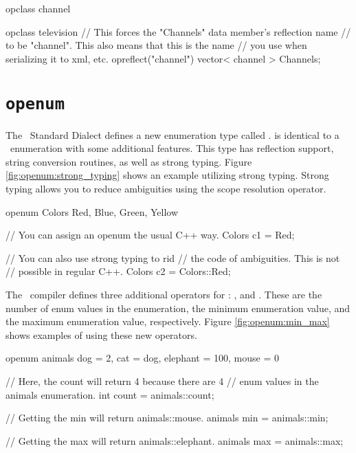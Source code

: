 \begin{opcpp}[label={fig:modifiers:opreflect},caption={Using the \opcppk{opreflect} data modifier.}]
opclass channel
{

}

opclass television
{
    // This forces the "Channels" data member's reflection name
    // to be "channel".  This also means that this is the name
    // you use when serializing it to xml, etc.
    opreflect("channel") vector< channel > Channels;
}
\end{opcpp}

\section{{\tt openum}}
\label{sec:opcpp_openum}

The \opCPP\ Standard Dialect defines a new enumeration type called .   is identical to a \cpp\ enumeration with some additional features.  This type has reflection support, string conversion routines, as well as strong typing.  Figure \ref{fig:openum:strong_typing} shows an example  utilizing strong typing.  Strong typing allows you to reduce ambiguities using the scope resolution operator. \\

\begin{opcpp}[label={fig:openum:strong_typing},caption={Example \opcppk{openum} utilizing strong typing.}]
openum Colors
{
    Red,
    Blue,
    Green,
    Yellow
}

// You can assign an openum the usual C++ way.
Colors c1 = Red;

// You can also use strong typing to rid
// the code of ambiguities.  This is not
// possible in regular C++.
Colors c2 = Colors::Red;
\end{opcpp}

The \opCPP\ compiler defines three additional operators for : ,  and .  These are the number of enum values in the enumeration, the minimum enumeration value, and the maximum enumeration value, respectively.  Figure \ref{fig:openum:min_max} shows examples of using these new operators. \\

\begin{opcpp}[label={fig:openum:min_max},caption={The \opcppk{count}, \opcppk{min} and \opcppk{max} \opcppk{openum} operators.}]
openum animals
{
    dog      = 2,
    cat      = dog,
    elephant = 100,
    mouse    = 0
}

// Here, the count will return 4 because there are 4
// enum values in the animals enumeration.
int count = animals::count;

// Getting the min will return animals::mouse.
animals min = animals::min;

// Getting the max will return animals::elephant.
animals max = animals::max;
\end{opcpp}

